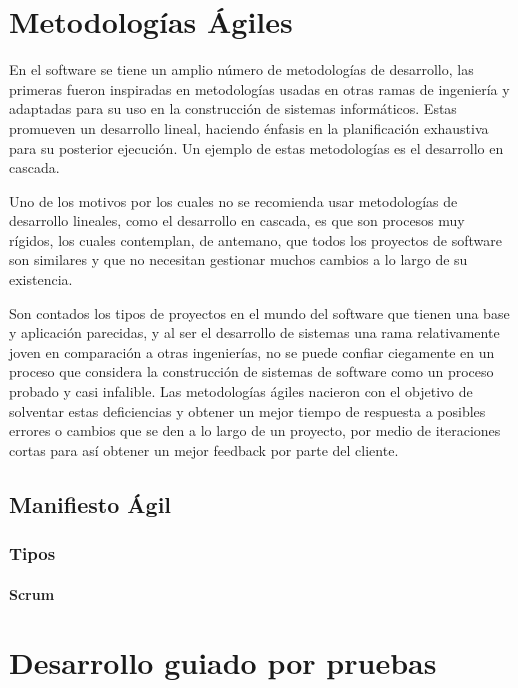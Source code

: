 \section{Metodologías Ágiles}

En el software se tiene un amplio número de metodologías de desarrollo, las
primeras fueron inspiradas en metodologías usadas en otras ramas de ingeniería
y adaptadas para su uso en la construcción de sistemas informáticos. Estas
promueven un desarrollo lineal, haciendo énfasis en la planificación exhaustiva
para su posterior ejecución. Un ejemplo de estas metodologías es el desarrollo
en cascada.

Uno de los motivos por los cuales no se recomienda usar metodologías de
desarrollo lineales, como el desarrollo en cascada, es que son procesos muy
rígidos,  los cuales  contemplan, de antemano, que todos los proyectos de
software son similares y que no necesitan gestionar muchos cambios a lo largo
de su existencia.

Son contados los tipos de proyectos en el mundo del software que tienen una
base y aplicación parecidas, y al ser el desarrollo de sistemas una rama
relativamente joven en comparación a otras ingenierías, no se puede confiar
ciegamente en un proceso que considera la construcción de sistemas de software
como un proceso probado y casi infalible. Las metodologías ágiles nacieron con
el objetivo de solventar estas deficiencias y obtener un mejor tiempo de
respuesta a posibles errores o cambios que se den a lo largo de un proyecto,
por medio de iteraciones cortas para así obtener un mejor feedback por parte
del cliente.

\subsection{Manifiesto Ágil}

\subsubsection{Tipos}

\paragraph{Scrum}

\section{Desarrollo guiado por pruebas}

